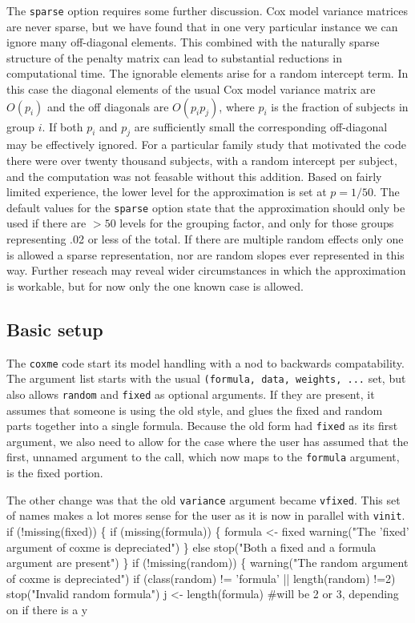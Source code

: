 \documentclass{article}
\begin{document}
The {\tt{}sparse} option requires some further discussion.
Cox model variance matrices are never sparse, but we have found that
in one very particular instance we can ignore many off-diagonal
elements.  This combined with the naturally sparse structure of
the penalty matrix can lead to substantial reductions in
computational time.  
The ignorable elements arise for a random intercept term.  In this case
the diagonal elements of the usual Cox model variance matrix
are $O(p_i)$ and the off diagonals are $O(p_i p_j)$, where $p_i$ is
the fraction of subjects in group $i$.
If both $p_i$ and $p_j$ are sufficiently small the corresponding
off-diagonal may be effectively ignored.
For a particular family study that motivated the code there were
over twenty thousand subjects, with a random intercept per subject, and
the computation was not feasable without this addition.
Based on fairly limited experience, the lower level for the
approximation is set at $p= 1/50$.  
The default values for the {\tt{}sparse} option state that the approximation
should only be used if there are $>50$ levels for the grouping factor, and
only for those groups representing .02 or less of the total.
If there are multiple random effects only one is allowed a sparse
representation, nor are random slopes ever represented in this way.
Further reseach may reveal wider circumstances in which the approximation
is workable, but for now only the one known case is allowed.



\subsection{Basic setup}
The {\tt{}coxme} code start its model handling with a nod to backwards
compatability.
The argument list starts with the usual {\tt{}(formula,\ data,\ weights,\ ...}
set, but also allows {\tt{}random} and {\tt{}fixed} as optional arguments.
If they are present, it assumes that someone is using the old style,
and glues the fixed and random parts together into a single formula.
Because the old form had {\tt{}fixed} as its first argument, we also
need to allow for the case where the user has assumed that the first,
unnamed argument to the call, which now maps to the {\tt{}formula}
argument, is the fixed portion.

The other change was that the old {\tt{}variance} argument became {\tt{}vfixed}.
This set of names makes a lot mores sense for the user as it is now
in parallel with {\tt{}vinit}.
\nwenddocs{}\endmoddef
if (!missing(fixed)) \{
    if (missing(formula)) \{
        formula <- fixed
        warning("The 'fixed' argument of coxme is depreciated")
        \}
    else stop("Both a fixed and a formula argument are present")
    \}
if (!missing(random)) \{
    warning("The random argument of coxme is depreciated")
    if (class(random) != 'formula' || length(random) !=2) 
        stop("Invalid random formula")
    j <- length(formula)   #will be 2 or 3, depending on if there is a y
\end{document}
